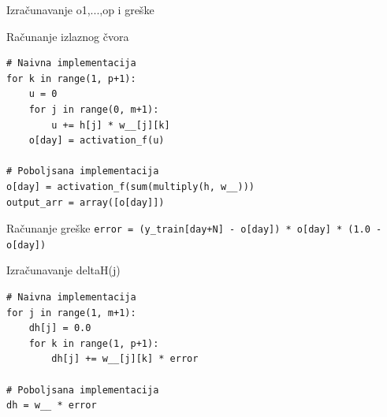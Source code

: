 \documentclass{beamer}
\begin{document}
\begin{frame}[fragile]{Izračunavanje o1,...,op i greške}
    \begin{block}{Računanje izlaznog čvora}
    \begin{Verbatim}[fontsize=\small]
# Naivna implementacija
for k in range(1, p+1):
    u = 0
    for j in range(0, m+1):
        u += h[j] * w__[j][k]
    o[day] = activation_f(u)

# Poboljsana implementacija
o[day] = activation_f(sum(multiply(h, w__)))
output_arr = array([o[day]])
    \end{Verbatim}
    \end{block}
    \begin{block}{Računanje greške}
        \texttt{error = (y\_train[day+N] - o[day]) * o[day] * (1.0 - o[day])}
    \end{block}
\end{frame}




\begin{frame}[fragile]{Izračunavanje deltaH(j)}
\begin{verbatim}
# Naivna implementacija
for j in range(1, m+1):
    dh[j] = 0.0
    for k in range(1, p+1):
        dh[j] += w__[j][k] * error
        
# Poboljsana implementacija
dh = w__ * error
\end{verbatim}
\end{frame}

\end{document}

